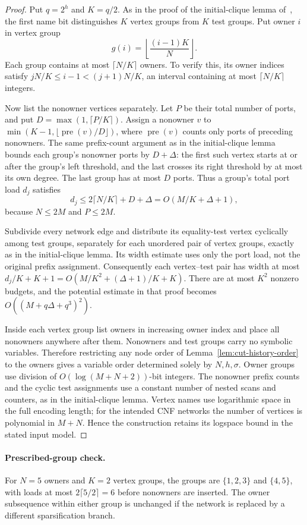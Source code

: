 \documentclass[11pt]{article}
\theoremstyle{definition}
\theoremstyle{remark}
\begin{document}
\begin{proof}
Put $q=2^h$ and $K=q/2$. As in the proof of the initial-clique lemma
of~\cite{Cruz26}, the first name bit distinguishes
$K$ vertex groups from $K$ test groups. Put owner $i$ in vertex group
\[
 g(i)=\left\lfloor\frac{(i-1)K}{N}\right\rfloor.
\]
Each group contains at most $\lceil N/K\rceil$ owners. To verify
this, its owner indices satisfy
$jN/K\le i-1<(j+1)N/K$, an interval containing at most
$\lceil N/K\rceil$ integers.

Now list the nonowner vertices separately. Let $P$ be their total
number of ports, and put $D=\max(1,\lceil P/K\rceil)$. Assign a
nonowner $v$ to
$\min(K-1,\lfloor\operatorname{pre}(v)/D\rfloor)$, where
$\operatorname{pre}(v)$ counts only ports of preceding nonowners.
The same prefix-count argument as in the initial-clique lemma bounds each
group's nonowner ports by $D+\Delta$: the first such vertex starts
at or after the group's left threshold, and the last crosses its
right threshold by at most its own degree. The last group has at
most $D$ ports. Thus a group's total port load $d_j$ satisfies
\[
 d_j\le 2\lceil N/K\rceil+D+\Delta=O(M/K+\Delta+1),
\]
because $N\le2M$ and $P\le2M$.

Subdivide every network edge and distribute its equality-test vertex
cyclically among test groups, separately for each unordered pair of
vertex groups, exactly as in the initial-clique lemma. Its width estimate uses
only the port load, not the original prefix assignment. Consequently
each vertex--test pair has width at most
$d_j/K+K+1=O(M/K^2+(\Delta+1)/K+K)$.
There are at most $K^2$ nonzero budgets, and the potential estimate
in that proof becomes
$O((M+q\Delta+q^3)^2)$.

Inside each vertex group list owners in increasing owner index and
place all nonowners anywhere after them. Nonowners and test groups
carry no symbolic variables. Therefore restricting any node order
of Lemma~\ref{lem:cut-history-order} to the owners gives a variable
order determined solely by $N,h,\sigma$. Owner groups use division
of $O(\log(M+N+2))$-bit integers. The nonowner prefix counts and the
cyclic test assignments use a constant number of nested scans and
counters, as in the initial-clique lemma. Vertex names use logarithmic space
in the full encoding length; for the intended CNF networks the number
of vertices is polynomial in $M+N$. Hence the construction retains its
logspace bound in the stated input model.
\end{proof}

\paragraph{Prescribed-group check.}
For $N=5$ owners and $K=2$ vertex groups, the groups are
$\{1,2,3\}$ and $\{4,5\}$, with loads at most
$2\lceil5/2\rceil=6$ before nonowners are inserted. The owner
subsequence within either group is unchanged if the network is
replaced by a different sparsification branch.
\end{document}
